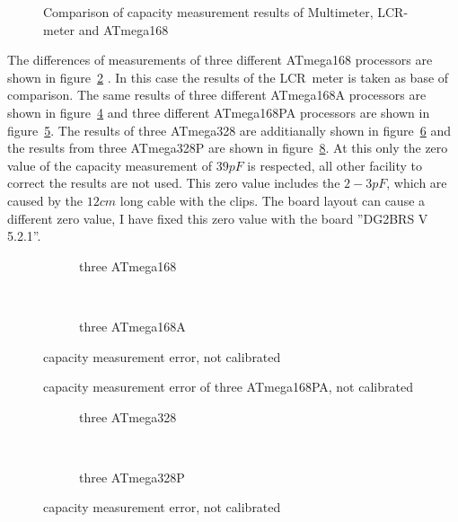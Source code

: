 \begin{figure}[H]
\centering

\caption{Comparison of capacity measurement results of Multimeter, LCR-meter and ATmega168}
\label{fig:capcompare}
\end{figure}

The differences of measurements of three different ATmega168 processors are shown in figure~\ref{fig:mega168all} .
In this case the results of the LCR~meter is taken as base of comparison.
The same results of three different ATmega168A processors are shown in figure~\ref{fig:mega168Aall} and
three different ATmega168PA processors are shown in figure~\ref{fig:mega168PAall}.
The results of three ATmega328 are additianally shown in figure~\ref{fig:mega328all} and the results from three
ATmega328P are shown in figure~\ref{fig:mega328Pall}.
At this only the zero value of the capacity measurement of \(39pF\) is respected, all other facility to correct the results are
not used.
This zero value includes the \(2-3pF\), which are caused by the \(12cm\) long cable with the clips.
The board layout can cause a different zero value, I have fixed this zero value with the board ''DG2BRS V 5.2.1''.

\begin{figure}[H]
  \begin{subfigure}[b]{9cm}
    \centering
    \resizebox{9cm}{!}{}
    \caption{three ATmega168}
    \label{fig:mega168all}
  \end{subfigure}
  ~
  \begin{subfigure}[b]{9cm}
    \centering
    \resizebox{9cm}{!}{}
    \caption{three ATmega168A}
    \label{fig:mega168Aall}
  \end{subfigure}
\caption{capacity measurement error, not calibrated}
\end{figure}

\begin{figure}[H]
\centering

\caption{capacity measurement error of three ATmega168PA, not calibrated}
\label{fig:mega168PAall}
\end{figure}

\begin{figure}[H]
  \begin{subfigure}[b]{9cm}
    \centering
    \resizebox{9cm}{!}{}
    \caption{three ATmega328}
    \label{fig:mega328all}
  \end{subfigure}
  ~
  \begin{subfigure}[b]{9cm}
    \centering
    \resizebox{9cm}{!}{}
    \caption{three ATmega328P}
    \label{fig:mega328Pall}
  \end{subfigure}
\caption{capacity measurement error, not calibrated}
\end{figure}

